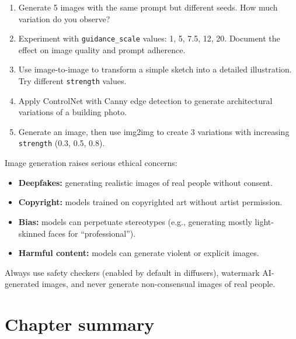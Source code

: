 \begin{exercise}
\begin{enumerate}
  \item Generate 5 images with the same prompt but different seeds. How much variation do you observe?
  \item Experiment with \texttt{guidance\_scale} values: 1, 5, 7.5, 12, 20. Document the effect on image quality and prompt adherence.
  \item Use image-to-image to transform a simple sketch into a detailed illustration. Try different \texttt{strength} values.
  \item Apply ControlNet with Canny edge detection to generate architectural variations of a building photo.
  \item Generate an image, then use img2img to create 3 variations with increasing \texttt{strength} (0.3, 0.5, 0.8).
\end{enumerate}
\end{exercise}

\begin{ethicsbox}
Image generation raises serious ethical concerns:
\begin{itemize}
  \item \textbf{Deepfakes:} generating realistic images of real people without consent.
  \item \textbf{Copyright:} models trained on copyrighted art without artist permission.
  \item \textbf{Bias:} models can perpetuate stereotypes (e.g., generating mostly light-skinned faces for ``professional'').
  \item \textbf{Harmful content:} models can generate violent or explicit images.
\end{itemize}
Always use safety checkers (enabled by default in diffusers), watermark AI-generated images, and never generate non-consensual images of real people.
\end{ethicsbox}

\section{Chapter summary}

